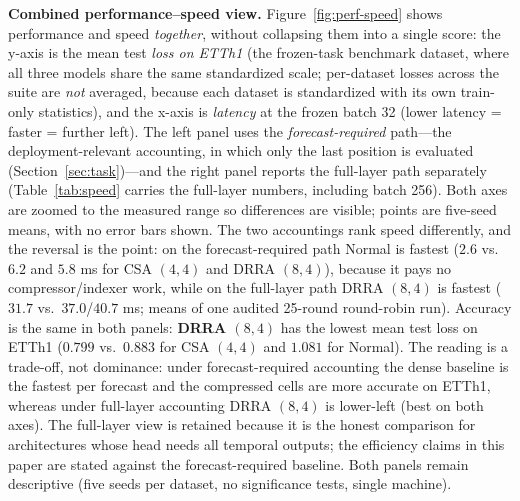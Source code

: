 \textbf{Combined performance--speed view.}
Figure~\ref{fig:perf-speed} shows performance and speed \emph{together},
without collapsing them into a single score: the y-axis is the mean test
\emph{loss on ETTh1} (the frozen-task benchmark dataset, where all three
models share the same standardized scale; per-dataset losses across the
suite are \emph{not} averaged, because each dataset is standardized with
its own train-only statistics), and the x-axis is \emph{latency} at the
frozen batch 32 (lower latency = faster = further left). The left panel
uses the \emph{forecast-required} path---the deployment-relevant
accounting, in which only the last position is evaluated
(Section~\ref{sec:task})---and the right panel reports the full-layer path
separately (Table~\ref{tab:speed} carries the full-layer numbers, including
batch 256). Both axes are zoomed to the measured range so differences are
visible; points are five-seed means, with no error bars shown. The two
accountings rank speed differently, and the reversal is the point: on the
forecast-required path Normal is fastest ($2.6$ vs.\ $6.2$ and $5.8$ ms for
CSA $(4,4)$ and DRRA $(8,4)$), because it pays no compressor/indexer work,
while on the full-layer path DRRA $(8,4)$ is fastest ($31.7$ vs.\
$37.0$/$40.7$ ms; means of one audited 25-round round-robin run). Accuracy
is the same in both panels: \textbf{DRRA $(8,4)$} has the lowest mean test
loss on ETTh1 ($0.799$ vs.\ $0.883$ for CSA $(4,4)$ and $1.081$ for Normal).
The reading is a trade-off, not dominance: under forecast-required
accounting the dense baseline is the fastest per forecast and the
compressed cells are more accurate on ETTh1, whereas under full-layer
accounting DRRA $(8,4)$ is lower-left (best on both axes). The full-layer
view is retained because it is the honest comparison for architectures
whose head needs all temporal outputs; the efficiency claims in this paper
are stated against the forecast-required baseline. Both panels remain
descriptive (five seeds per dataset, no significance tests, single
machine).

